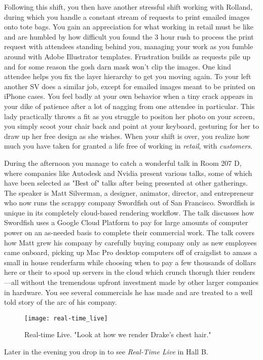\documentclass[../main.tex]{subfiles}
\begin{document}
Following this shift, you then have another stressful shift working with Rolland, during which you handle a constant stream of requests to print emailed images onto tote bags. You gain an appreciation for what working in retail must be like and are humbled by how difficult you found the 3 hour rush to process the print request with attendees standing behind you, managing your work as you fumble around with Adobe Illustrator templates. Frustration builds as requests pile up and for some reason the gosh darn mask won't clip the images. One kind attendee helps you fix the layer hierarchy to get you moving again. To your left another SV does a similar job, except for emailed images meant to be printed on iPhone cases. You feel badly at your own behavior when a tiny crack appears in your dike of patience after a lot of nagging from one attendee in particular. This lady practically throws a fit as you struggle to positon her photo on your screen, you simply scoot your chair back and point at your keyboard, gesturing for her to draw up her free design as she wishes. When your shift is over, you realize how much you have taken for granted a life free of working in \textit{retail}, with \textit{customers}.

During the afternoon you manage to catch a wonderful talk in Room 207 D, where companies like Autodesk and Nvidia present various talks, some of which have been selected as "Best of" talks after being presented at other gatherings. The speaker is Matt Silverman, a designer, animator, director, and entrepreneur who now runs the scrappy company Swordfish out of San Francisco. Swordfish is unique in its completely cloud-based rendering workflow. The talk discusses how Swordfish uses a Google Cloud Platform to pay for large amounts of computer power on an as-needed basis to complete their commercial work. The talk covers how Matt grew his company by carefully buying company only as new employees came onboard, picking up Mac Pro desktop computers off of craigslist to amass a small in house renderfarm while choosing when to pay a few thousands of dollars here or their to spool up servers in the cloud which crunch thorugh thier renders---all without the tremendous upfront investment made by other larger companies in hardware. You see several commercials he has made and are treated to a well told story of the arc of his company.

\begin{figure}[h!]
	\centering
	\texttt{[image: real-time\_live]}
	\caption*{Real-time Live. "Look at how we render Drake's chest hair."}
\end{figure}

Later in the evening you drop in to see \textit{Real-Time Live} in Hall B. 
\end{document}
